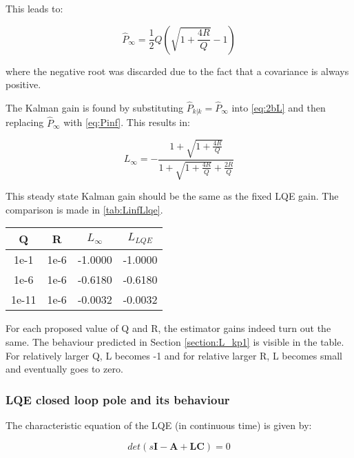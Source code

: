 \documentclass[a4paper]{article}
\newcommand{\newpar}{\vspace{.3cm}\noindent}
\begin{document}
\newpar
This leads to:

\begin{equation}
    \hat{P}_{\infty} = \frac{1}{2} Q \left( \sqrt{1+\frac{4R}{Q}} - 1\right)
    \label{eq:Pinf}
\end{equation}

\newpar
where the negative root was discarded due to the fact that a covariance is always positive.

\newpar
The Kalman gain is found by substituting \(\hat{P}_{k|k} = \hat{P}_{\infty}\) into \autoref{eq:2bL} and then replacing \(\hat{P}_{\infty}\) with \autoref{eq:Pinf}. This results in:

\begin{equation}
    L_{\infty} = -\frac{1+\sqrt{1+\frac{4R}{Q}}}{1+\sqrt{1+\frac{4R}{Q}}+\frac{2R}{Q}}
    \label{eq:Linf}
\end{equation}

\newpar
This steady state Kalman gain should be the same as the fixed LQE gain. The comparison is made in \autoref{tab:LinfLlqe}.

\begin{center}
    \begin{tabular}{ |c|c|c|c|}
    \hline
     Q & R & \(L_{\infty}\) & \(L_{LQE}\) \\
    \hline
    1e-1 & 1e-6 & -1.0000 & -1.0000 \\
    \hline
    1e-6 & 1e-6 & -0.6180 & -0.6180 \\
    \hline
    1e-11 & 1e-6 & -0.0032 & -0.0032 \\
    \hline
    \end{tabular}  
    \label{tab:LinfLlqe}
\end{center}

\newpar
For each proposed value of Q and R, the estimator gains indeed turn out the same. The behaviour predicted in Section \ref{section:L_kp1} is visible in the table. For relatively larger Q, L becomes -1 and for relative larger R, L becomes small and eventually goes to zero.

\subsubsection{LQE closed loop pole and its behaviour}

The characteristic equation of the LQE (in continuous time) is given by:

\begin{equation}
    det\left(s\textbf{I}-\textbf{A}+\textbf{LC}\right) = 0
\end{equation}
\end{document}

